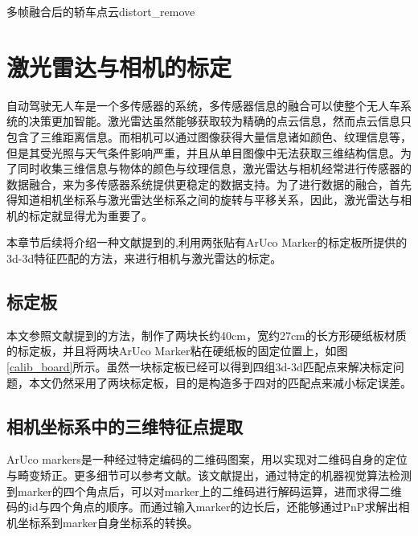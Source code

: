 \begin{pics}[htbp]{多帧融合后的轿车点云}{distort_remove}
\end{pics}

\section{激光雷达与相机的标定}

自动驾驶无人车是一个多传感器的系统，多传感器信息的融合可以使整个无人车系统的决策更加智能。激光雷达虽然能够获取较为精确的点云信息，然而点云信息只包含了三维距离信息。而相机可以通过图像获得大量信息诸如颜色、纹理信息等，但是其受光照与天气条件影响严重，并且从单目图像中无法获取三维结构信息。为了同时收集三维信息与物体的颜色与纹理信息，激光雷达与相机经常进行传感器的数据融合，来为多传感器系统提供更稳定的数据支持。为了进行数据的融合，首先得知道相机坐标系与激光雷达坐标系之间的旋转与平移关系，因此，激光雷达与相机的标定就显得尤为重要了。

本章节后续将介绍一种文献提到的,利用两张贴有ArUco Marker的标定板所提供的3d-3d特征匹配的方法，来进行相机与激光雷达的标定。

\subsection{标定板}
本文参照文献提到的方法，制作了两块长约40cm，宽约27cm的长方形硬纸板材质的标定板，并且将两块ArUco Marker粘在硬纸板的固定位置上，如图\ref{calib_board}所示。虽然一块标定板已经可以得到四组3d-3d匹配点来解决标定问题，本文仍然采用了两块标定板，目的是构造多于四对的匹配点来减小标定误差。


\subsection{相机坐标系中的三维特征点提取}

ArUco markers是一种经过特定编码的二维码图案，用以实现对二维码自身的定位与畸变矫正。更多细节可以参考文献。该文献提出，通过特定的机器视觉算法检测到marker的四个角点后，可以对marker上的二维码进行解码运算，进而求得二维码的id与四个角点的顺序。而通过输入marker的边长后，还能够通过PnP求解出相机坐标系到marker自身坐标系的转换。


